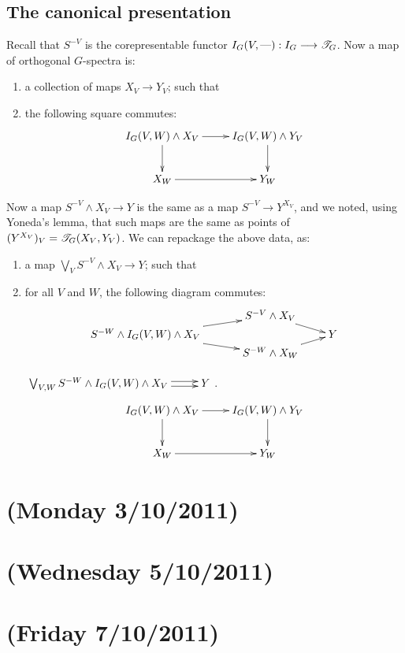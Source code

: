 \documentclass[11pt]{article}
\newcommand{\NewLecture}[3]{\section{#1 {\small(#2/#3/2011)}}}
\begin{document}
\begin{FifthWeek}
\subsection*{The canonical presentation}
Recall that $S^{-V}$ is the corepresentable functor $I_G(V,\textup{---}):I_G\longrightarrow \mathscr{T}_G$.
Now a map of orthogonal $G$-spectra is:
\begin{enumerate}\squishlist
\item a collection of maps $X_V\to Y_V$; such that
\item the following square commutes:
\[\xymatrix{
\ar[d]I_G(V,W)\wedge X_V\ar[r]&I_G(V,W)\wedge Y_V\ar[d]\\
X_W\ar[r]&Y_W
}\]
\end{enumerate}
Now a map $S^{-V}\wedge X_V\to Y$ is the same as a map $S^{-V}\to Y^{X_V}$, and we noted, using Yoneda's lemma, that such maps are the same as points of $(Y^{X_V})_V=\mathscr{T}_G(X_V,Y_V)$. We can repackage the above data, as:
\begin{enumerate}\squishlist
\item a map $\bigvee_VS^{-V}\wedge X_V\to Y$; such that
\item for all $V$ and $W$, the following diagram commutes:
\[\xymatrix@!0@C=2cm@R=.6cm{
&&S^{-V}\wedge X_V\ar[rd]\\
S^{-W}\wedge I_G(V,W)\wedge X_V\ar[urr]\ar[drr]&&&Y\\
&&S^{-W}\wedge X_W\ar[ru]
}\]


$\xymatrix{\bigvee_{V,W}S^{-W}\wedge I_G(V,W)\wedge X_V\ar@<.5ex>[r]\ar@<-.5ex>[r]&Y}$.%
\[\xymatrix{
\ar[d]I_G(V,W)\wedge X_V\ar[r]&I_G(V,W)\wedge Y_V\ar[d]\\
X_W\ar[r]&Y_W
}\]
\end{enumerate}
\end{FifthWeek}
\begin{SixthWeek}
\setcounter{section}{12}
\NewLecture{}{Monday 3}{10}
\NewLecture{}{Wednesday 5}{10}
\NewLecture{}{Friday 7}{10}
\end{SixthWeek}
\end{document}
